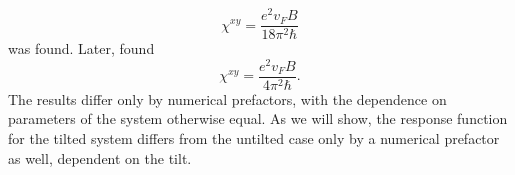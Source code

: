 \begin{equation}
  \chi ^{xy} = \frac{e^2 v_F B}{18 \pi ^2 \hbar }
\end{equation}
was found.
Later, \textcite{arjonaFingerprintsConformalAnomaly2019} found%
\begin{equation}
  \chi ^{xy} = \frac{e^2 v_F B}{4 \pi ^2 \hbar }.
\end{equation}
The results differ only by numerical prefactors, with the dependence on parameters of the system otherwise equal.
As we will show, the response function for the tilted system differs from the untilted case only by a numerical prefactor as well, dependent on the tilt.

